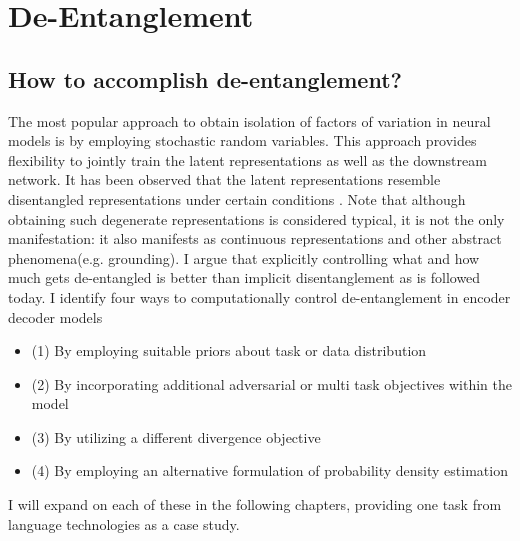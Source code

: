 \chapter{De-Entanglement}

\section{How to accomplish de-entanglement?}

The most popular approach to obtain isolation of factors of variation in neural models is by employing stochastic random variables. This approach provides flexibility to jointly train the latent representations as well as the downstream  network. It has been observed that the latent representations resemble disentangled representations under certain conditions \citep{isolating_sources_betavae, understanding_disentanglement_betavae,structured_disentangled_representations,hyperprior_disentanglement}. Note that although obtaining such degenerate representations is considered typical, it is not the only manifestation: it also manifests as continuous representations\citep{ravanelli2018interpretablesyncnet} and other abstract phenomena(e.g. grounding). I argue that explicitly controlling what and how much gets de-entangled \citep{understanding_disentanglement_betavae} is better than implicit disentanglement as is followed today\citep{locatello2018challenging}. I identify four ways to computationally control de-entanglement in encoder decoder models

\begin{itemize}
    \item (1) By employing suitable priors about task or data distribution
    \item (2) By incorporating additional adversarial or multi task objectives within the model
    \item (3) By utilizing a different divergence objective
    \item (4) By employing an alternative formulation of probability density estimation
\end{itemize}

I will  expand on each of these in the following chapters, providing one task from language technologies as a case study. 



